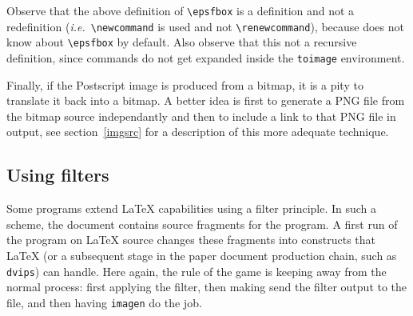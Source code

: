 Observe that the above definition of \verb+\epsfbox+ is a definition
and not a redefinition (\emph{i.e.}\ \verb+\newcommand+ is used and not
\verb+\renewcommand+),
because \hevea{} does not know about \verb+\epsfbox+ by default.
Also observe that this not a recursive definition, since
commands do not get expanded inside the \verb+toimage+ environment.

Finally, if the Postscript image is produced from a bitmap, it is
a pity to translate it back into a bitmap.
A better idea is first to generate a PNG file from the bitmap source
independantly
and then to include a link to that PNG file in \html{} output, see
section~\ref{imgsrc} for a description of this more adequate technique.


\subsection{Using filters}

Some programs extend \LaTeX{} capabilities using a filter principle.
In such a scheme, the document contains source fragments for the program.
A first run of the program on \LaTeX{} source changes these fragments
into constructs that \LaTeX{} (or a subsequent stage in the paper
document production chain, such as \texttt{dvips}) can handle.
Here again, the rule of the game is keeping \hevea{} away from the
normal process: first applying the filter, then making \hevea{} send
the filter output to the  file, and then having
\texttt{imagen} do the job.


